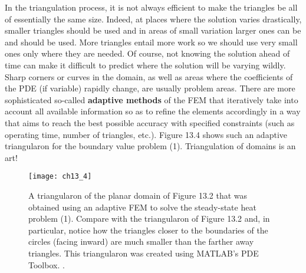 \documentclass[../main.tex]{subfiles}
\begin{document}
In the triangulation process, it is not always efficient to make the triangles be all of essentially the same size. Indeed, at places where the solution varies drastically, smaller triangles should be used and in areas of small variation larger ones can be and should be used. More triangles entail more work so we should use very small ones only where they are needed. Of course, not knowing the solution ahead of time can make it difficult to predict where the solution will be varying wildly. Sharp corners or curves in the domain, as well as areas where the coefficients of the PDE (if variable) rapidly change, are usually problem areas. There are more sophisticated so-called \textbf{adaptive methods} of the FEM that iteratively take into account all available information so as to refine the elements accordingly in a way that aims to reach the best possible accuracy with specified constraints (such as operating time, number of triangles, etc.). Figure 13.4 shows such an adaptive triangularon for the boundary value problem (1). Triangulation of domains is an art!

\begin{figure}[H]
	\centering
	\texttt{[image: ch13\_4]}
	\caption{\textsf{A triangularon of the planar domain of Figure 13.2 that was obtained using an adaptive FEM to solve the steady-state heat problem (1). Compare with the triangularon of Figure 13.2 and, in particular, notice how the triangles closer to the boundaries of the circles (facing inward) are much smaller than the farther away triangles. This triangularon was created using MATLAB's PDE Toolbox. .}}
	\label{pfig:ch13_4}
\end{figure}
\end{document}
